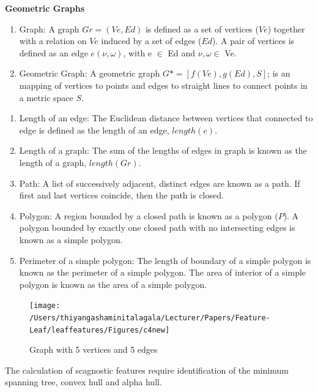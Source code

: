 \documentclass{article}
\begin{document}
\textbf{Geometric Graphs}

\begin{enumerate}
\def\labelenumi{\roman{enumi})}
\item
  Graph: A graph \(Gr = (Ve, Ed)\) is defined as a set of vertices
  (\(Ve\)) together with a relation on \(Ve\) induced by a set of edges
  (\(Ed\)). A pair of vertices is defined as an edge \(e(\nu,\omega)\),
  with e \(\in\) Ed and \(\nu,\omega \in\) Ve.
\item
  Geometric Graph: A geometric graph \(G* = [f(Ve), g(Ed), S]\); is an
  mapping of vertices to points and edges to straight lines to connect
  points in a metric space \(S\).
\end{enumerate}

\begin{enumerate}
\def\labelenumi{\roman{enumi})}
\setcounter{enumi}{2}
\item
  Length of an edge: The Euclidean distance between vertices that
  connected to edge is defined as the length of an edge, \(length(e)\).
\item
  Length of a graph: The sum of the lengths of edges in graph is known
  as the length of a graph, \(length(Gr)\).
\item
  Path: A list of successively adjacent, distinct edges are known as a
  path. If first and last vertices coincide, then the path is closed.
\item
  Polygon: A region bounded by a closed path is known as a polygon
  (\(P\)). A polygon bounded by exactly one closed path with no
  intersecting edges is known as a simple polygon.
\item
  Perimeter of a simple polygon: The length of boundary of a simple
  polygon is known as the perimeter of a simple polygon. The area of
  interior of a simple polygon is known as the area of a simple polygon.
\end{enumerate}

\begin{figure}[!ht]

{\centering \texttt{[image: /Users/thiyangashaminitalagala/Lecturer/Papers/Feature-Leaf/leaffeatures/Figures/c4new]} 

}

\caption{\label{scagimg5}Graph with 5 vertices and 5 edges}\label{fig:unnamed-chunk-31}
\end{figure}

The calculation of scagnostic features require identification of the
minimum spanning tree, convex hull and alpha hull.
\end{document}
